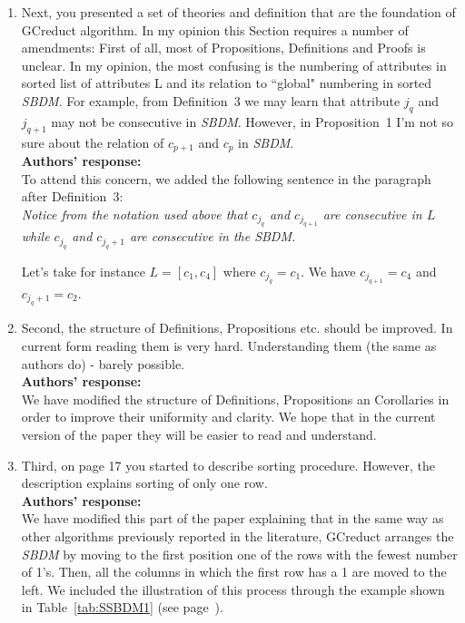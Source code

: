 \documentclass{letter}
\begin{document}
\begin{letter}{}
\begin{enumerate}
	\item Next, you presented a set of theories and definition that are the foundation of GCreduct algorithm. In my opinion this Section requires a number of amendments:
	First of all, most of Propositions, Definitions and Proofs is unclear. In my opinion, the most confusing is the numbering of attributes in sorted list of attributes L and its relation to ``global" numbering in sorted \textit{SBDM}.  For example, from Definition~3 we may learn that attribute $j_{q}$ and $j_{q+1}$ may not be consecutive in \textit{SBDM}. However, in Proposition~1 I'm not so sure about the relation of $c_{p+1}$ and $c_{p}$ in \textit{SBDM}.\\
	\textbf{Authors’ response:}\\
	To attend this concern, we added the following sentence in the paragraph after Definition~3:\\
	\textit{Notice from the notation used above that $c_{j_q}$ and $c_{j_{q+1}}$ are consecutive in $L$ while $c_{j_q}$ and $c_{j_q+1}$ are consecutive in the \textit{SBDM}.}
	
	Let's take for instance $L = [c_1,c_4]$ where $c_{j_q} = c_1$. We have $c_{j_{q+1}} = c_4$ and $c_{j_q+1}=c_2$.
	
	\item Second, the structure of  Definitions, Propositions etc. should be improved. In current form reading them is very hard. Understanding them (the same as authors do) - barely possible.\\
	\textbf{Authors’ response:}\\
	We have modified the structure of Definitions, Propositions an Corollaries in order to improve their uniformity and clarity. We hope that in the current version of the paper they will be easier to read and understand. 
	
	\item Third, on page 17 you started to describe sorting procedure. However, the description explains sorting of only one row.\\
	\textbf{Authors’ response:}\\
	 We have modified this part of the paper explaining that in the same way as other algorithms previously reported in the literature, GCreduct arranges the \textit{SBDM} by moving to the first position one of the rows with the fewest number of 1's. Then, all the columns in which the first row has a 1 are moved to the left. We included the illustration of this process through the example shown in Table~\ref{tab:SSBDM1} (see page~\pageref{arrange}).
	

\end{enumerate}
\end{letter}
\end{document}
